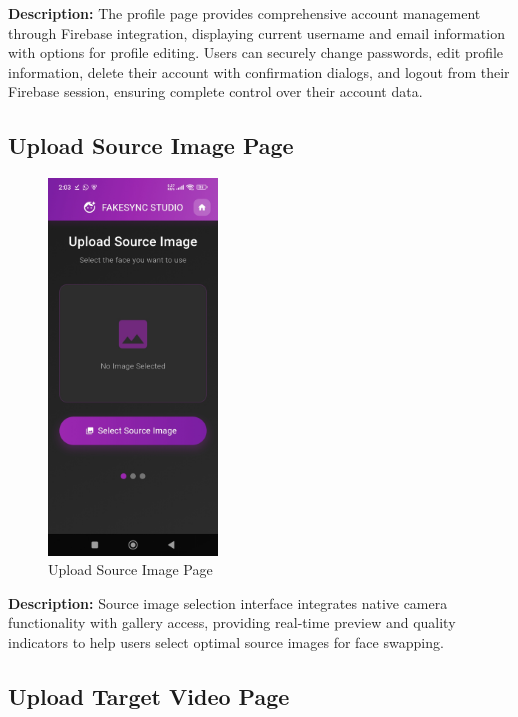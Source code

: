 \documentclass[12pt,a4paper]{report}
\begin{document}
\textbf{Description:} The profile page provides comprehensive account management through Firebase integration, displaying current username and email information with options for profile editing. Users can securely change passwords, edit profile information, delete their account with confirmation dialogs, and logout from their Firebase session, ensuring complete control over their account data.

\subsection{Upload Source Image Page}

\begin{figure}[H]
\centering
\includegraphics[width=0.4\textwidth]{figures/Upload_Source.png}
\caption{Upload Source Image Page}
\label{fig:Upload_Source_Image_Page}
\end{figure}

\textbf{Description:} Source image selection interface integrates native camera functionality with gallery access, providing real-time preview and quality indicators to help users select optimal source images for face swapping.

\subsection{Upload Target Video Page}
\end{document}
